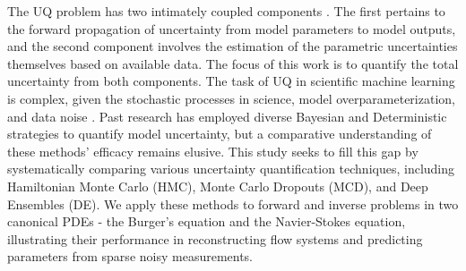 \documentclass{article}
\begin{document}
The UQ problem has two intimately coupled components \citep{najm2009uncertainty}. The first pertains to the forward propagation of uncertainty from model parameters to model outputs, and the second component involves the estimation of the parametric uncertainties themselves based on available data. The focus of this work is to quantify the total uncertainty from both components. The task of UQ in scientific machine learning is complex, given the stochastic processes in science, model overparameterization, and data noise \citep[e.g.,][]{he2023survey, gal2016uncertainty, basu2022uncertainty, zou2022neuraluq}. Past research has employed diverse Bayesian and Deterministic strategies to quantify model uncertainty, but a comparative understanding of these methods’ efficacy remains elusive. This study seeks to fill this gap by systematically comparing various uncertainty quantification techniques, including Hamiltonian Monte Carlo (HMC), Monte Carlo Dropouts (MCD), and Deep Ensembles (DE).
We apply these methods to forward and inverse problems in two canonical PDEs - the Burger’s equation and the Navier-Stokes equation, illustrating their performance in reconstructing flow systems and predicting parameters from sparse noisy measurements. 


\end{document}
